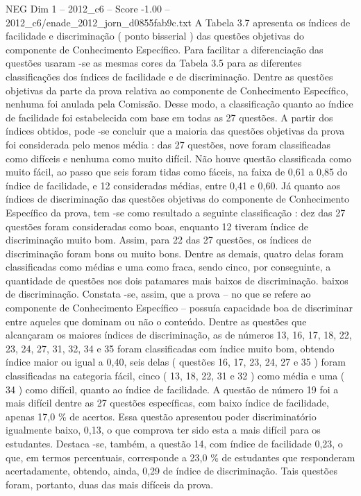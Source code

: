 \begin{textsample}{NEG Dim 1 – 2012\_c6 – Score -1.00 – 2012\_c6/enade\_2012\_jorn\_d0855fab9c.txt}
A Tabela 3.7 apresenta os índices de facilidade e discriminação ( ponto bisserial ) das questões objetivas do componente de Conhecimento Específico.
Para facilitar a diferenciação das questões usaram -se as mesmas cores da Tabela 3.5 para as diferentes classificações dos índices de facilidade e de discriminação.
Dentre as questões objetivas da parte da prova relativa ao componente de Conhecimento Específico, nenhuma foi anulada pela Comissão.
Desse modo, a classificação quanto ao índice de facilidade foi estabelecida com base em todas as 27 questões.
A partir dos índices obtidos, pode -se concluir que a maioria das questões objetivas da prova foi considerada pelo menos média : das 27 questões, nove foram classificadas como difíceis e nenhuma como muito difícil.
Não houve questão classificada como muito fácil, ao passo que seis foram tidas como fáceis, na faixa de 0,61 a 0,85 do índice de facilidade, e 12 consideradas médias, entre 0,41 e 0,60.
Já quanto aos índices de discriminação das questões objetivas do componente de Conhecimento Específico da prova, tem -se como resultado a seguinte classificação : dez das 27 questões foram consideradas como boas, enquanto 12 tiveram índice de discriminação muito bom.
Assim, para 22 das 27 questões, os índices de discriminação foram bons ou muito bons.
Dentre as demais, quatro delas foram classificadas como médias e uma como fraca, sendo cinco, por conseguinte, a quantidade de questões nos dois patamares mais baixos de discriminação. baixos de discriminação.
Constata -se, assim, que a prova – no que se refere ao componente de Conhecimento Específico – possuía capacidade boa de discriminar entre aqueles que dominam ou não o conteúdo.
Dentre as questões que alcançaram os maiores índices de discriminação, as de números 13, 16, 17, 18, 22, 23, 24, 27, 31, 32, 34 e 35 foram classificadas com índice muito bom, obtendo índice maior ou igual a 0,40, seis delas ( questões 16, 17, 23, 24, 27 e 35 ) foram classificadas na categoria fácil, cinco ( 13, 18, 22, 31 e 32 ) como média e uma ( 34 ) como difícil, quanto ao índice de facilidade.
A questão de número 19 foi a mais difícil dentre as 27 questões específicas, com baixo índice de facilidade, apenas 17,0 \% de acertos.
Essa questão apresentou poder discriminatório igualmente baixo, 0,13, o que comprova ter sido esta a mais difícil para os estudantes.
Destaca -se, também, a questão 14, com índice de facilidade 0,23, o que, em termos percentuais, corresponde a 23,0 \% de estudantes que responderam acertadamente, obtendo, ainda, 0,29 de índice de discriminação.
Tais questões foram, portanto, duas das mais difíceis da prova.

\end{textsample}
